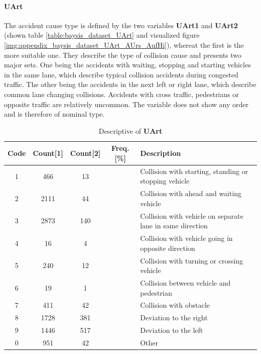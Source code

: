 \paragraph{UArt}
The accident cause type is defined by the two variables \textbf{UArt1} and \textbf{UArt2} (shown table \autoref{table:baysis_dataset_UArt} and visualized figure \autoref{img:appendix_baysis_dataset_UArt_AUrs_AufHi}), whereat the first is the more suitable one. They describe the type of collision cause and presents two major sets. One being the accidents with waiting, stopping and starting vehicles in the same lane, which describe typical collision accidents during congested traffic. The other being the accidents in the next left or right lane, which describe common lane changing collisions. Accidents with cross traffic, pedestrians or opposite traffic are relatively uncommon. The variable does not show any order and is therefore of nominal type.
\begin{table}[ht]
	\centering
	\small
	\begin{tabular}{c|c|c|c|l} 
		\toprule
		Code & Count[1] & Count[2] & Freq. [\%] & Description \\ 
		\midrule
 		1 & 466		& 13	& & Collision with starting, standing or stopping vehicle  \\ 
 		2 & 2111	& 44 	& & Collision with ahead and waiting vehicle  \\
 		3 & 2873	& 140	& & Collision with vehicle on separate lane in same direction  \\
 		4 &	16		& 4		& & Collision with vehicle going in opposite direction  \\
 		5 & 240		& 12	& & Collision with turning or crossing vehicle  \\
 		6 & 19		& 1		& & Collision between vehicle and pedestrian  \\
 		7 & 411		& 42	& & Collision with obstacle  \\
 		8 & 1728	& 381	& & Deviation to the right  \\
 		9 & 1446	& 517	& & Deviation to the left  \\
		0 & 951		& 42	& & Other  \\
		\bottomrule
	\end{tabular}
	\caption{Descriptive of \textbf{UArt}}
	\label{table:baysis_dataset_UArt}
	\vspace{-8mm}
\end{table}

